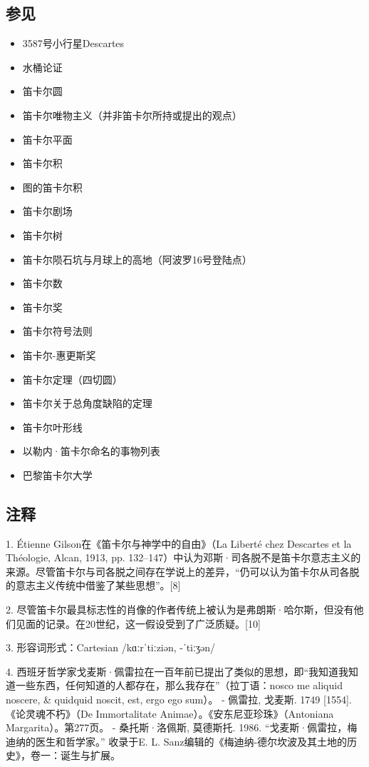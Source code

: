 \subsection{参见}
\begin{itemize}
\item 3587号小行星Descartes
\item 水桶论证
\item 笛卡尔圆
\item 笛卡尔唯物主义（并非笛卡尔所持或提出的观点）
\item 笛卡尔平面
\item 笛卡尔积
\item  图的笛卡尔积
\item 笛卡尔剧场
\item 笛卡尔树
\item 笛卡尔陨石坑与月球上的高地（阿波罗16号登陆点）
\item 笛卡尔数
\item 笛卡尔奖
\item 笛卡尔符号法则
\item 笛卡尔-惠更斯奖
\item 笛卡尔定理（四切圆）
\item 笛卡尔关于总角度缺陷的定理
\item 笛卡尔叶形线
\item 以勒内·笛卡尔命名的事物列表
\item 巴黎笛卡尔大学
\end{itemize}
\subsection{注释}

1. Étienne Gilson在《笛卡尔与神学中的自由》（La Liberté chez Descartes et la Théologie, Alcan, 1913, pp. 132–147）中认为邓斯·司各脱不是笛卡尔意志主义的来源。尽管笛卡尔与司各脱之间存在学说上的差异，“仍可以认为笛卡尔从司各脱的意志主义传统中借鉴了某些思想”。[8]

2. 尽管笛卡尔最具标志性的肖像的作者传统上被认为是弗朗斯·哈尔斯，但没有他们见面的记录。在20世纪，这一假设受到了广泛质疑。[10]

3. 形容词形式：Cartesian /kɑːrˈtiːziən, -ˈtiːʒən/

4. 西班牙哲学家戈麦斯·佩雷拉在一百年前已提出了类似的思想，即“我知道我知道一些东西，任何知道的人都存在，那么我存在”（拉丁语：nosco me aliquid noscere, & quidquid noscit, est, ergo ego sum）。
   - 佩雷拉, 戈麦斯. 1749 [1554]. 《论灵魂不朽》（De Immortalitate Animae）。《安东尼亚珍珠》（Antoniana Margarita）。第277页。
   - 桑托斯·洛佩斯, 莫德斯托. 1986. “戈麦斯·佩雷拉，梅迪纳的医生和哲学家。” 收录于E. L. Sanz编辑的《梅迪纳-德尔坎波及其土地的历史》，卷一：诞生与扩展。

